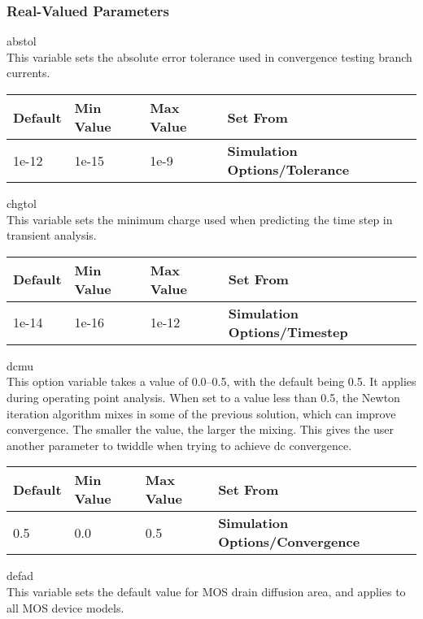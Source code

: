 \subsubsection{Real-Valued Parameters}

\begin{description}
\item{\et abstol}\\
This variable sets the absolute error tolerance used in convergence
testing branch currents.

\begin{tabular}{|l|l|l|l|}\hline
\bf Default & \bf Min Value & \bf Max Value & \bf Set From\\ \hline
1e-12 & 1e-15 & 1e-9 & \bf Simulation Options/Tolerance\\ \hline
\end{tabular}
 
\item{\et chgtol}\\
This variable sets the minimum charge used when predicting the time
step in transient analysis.

\begin{tabular}{|l|l|l|l|}\hline
\bf Default & \bf Min Value & \bf Max Value & \bf Set From\\ \hline
1e-14 & 1e-16 & 1e-12 & \bf Simulation Options/Timestep\\ \hline
\end{tabular}

\item{\et dcmu}\\
This option variable takes a value of 0.0--0.5, with the default being
0.5.  It applies during operating point analysis.  When set to a value
less than 0.5, the Newton iteration algorithm mixes in some of the
previous solution, which can improve convergence.  The smaller the
value, the larger the mixing.  This gives the user another parameter
to twiddle when trying to achieve dc convergence.

\begin{tabular}{|l|l|l|l|}\hline
\bf Default & \bf Min Value & \bf Max Value & \bf Set From\\ \hline
0.5 & 0.0 & 0.5 & \bf Simulation Options/Convergence\\ \hline
\end{tabular}

\item{\et defad}\\
This variable sets the default value for MOS drain diffusion area, and
applies to all MOS device models.


\end{description}
